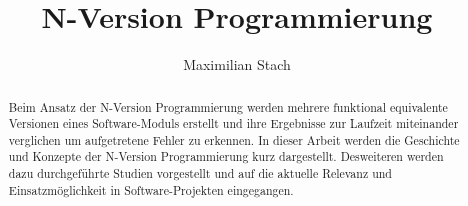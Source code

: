 \title{N-Version Programmierung}



\author{Maximilian Stach}
%




\maketitle


\begin{abstract}
Beim Ansatz der N-Version Programmierung werden mehrere funktional equivalente Versionen eines Software-Moduls erstellt und ihre Ergebnisse zur Laufzeit miteinander verglichen um aufgetretene Fehler zu erkennen.
In dieser Arbeit werden die Geschichte und Konzepte der N-Version Programmierung kurz dargestellt. Desweiteren werden dazu durchgeführte Studien vorgestellt und auf die aktuelle Relevanz und Einsatzmöglichkeit in Software-Projekten eingegangen.


\end{abstract}
